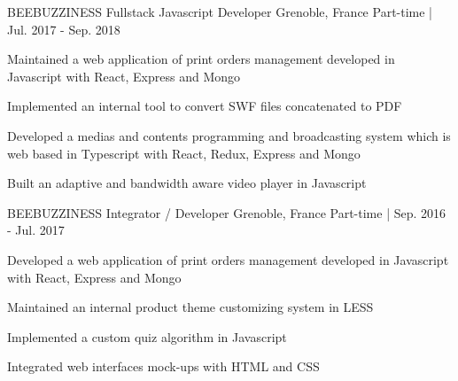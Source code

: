 

\begin{cventries}

  \cventry
  	{BEEBUZZINESS} %
    {Fullstack Javascript Developer} %
    {Grenoble, France} %
    {Part-time | Jul. 2017 - Sep. 2018} %
    {
      \begin{cvitems} %
        \item {Maintained a web application of print orders management developed in Javascript with React, Express and Mongo}
        \item {Implemented an internal tool to convert SWF files concatenated to PDF}
        \item {Developed a medias and contents programming and broadcasting system which is web based in Typescript with React, Redux, Express and Mongo}
        \item {Built an adaptive and bandwidth aware video player in Javascript}
      \end{cvitems}
    }

  \cventry
  	{BEEBUZZINESS} %
    {Integrator / Developer} %
    {Grenoble, France} %
    {Part-time | Sep. 2016 - Jul. 2017} %
    {
      \begin{cvitems} %
        \item {Developed a web application of print orders management developed in Javascript with React, Express and Mongo}
        \item {Maintained an internal product theme customizing system in LESS}
        \item {Implemented a custom quiz algorithm in Javascript}
        \item {Integrated web interfaces mock-ups with HTML and CSS}
      \end{cvitems}
    }

\end{cventries}
